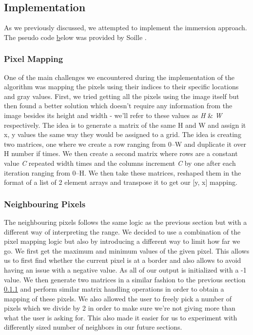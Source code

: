 \documentclass{article}
\begin{document}
\subsection{Implementation}
As we previously discussed, we attempted to implement the immersion approach. The pseudo code \href{alg:immersion_alg} below was provided by Soille \cite{soilletextbook}.
\newline
\subsubsection{Pixel Mapping}
\label{sec:pixel_mapping}
\begin{flushleft}
One of the main challenges we encountered during the implementation of the algorithm was mapping the pixels using their indices to their specific locations and gray values. First, we tried getting all the pixels using the image itself but then found a better solution which doesn't require any information from the image besides its height and width - we'll refer to these values as \textit{H} \& \textit{W} respectively. The idea is to generate a matrix of the same H and W and assign it x, y values the same way they would be assigned to a grid. The idea is creating two matrices, one where we create a row ranging from \numrange[range-phrase = --]{0}{W} and duplicate it over H number if times. We then create a second matrix where rows are a constant value \textit{C} repeated width times and the columns increment \textit{C} by one after each iteration ranging from \numrange[range-phrase = --]{0}{H}. We then take these matrices, reshaped them in the format of a list of 2 element arrays and transpose it to get our [y, x] mapping.
\end{flushleft}
\subsubsection{Neighbouring Pixels}
\begin{flushleft}
The neighbouring pixels follows the same logic as the previous section but with a different way of interpreting the range.  We decided to use a combination of the pixel mapping logic but also by introducing a different way to limit how far we go. We first get the maximum and minimum values of the given pixel. This allows us to first find whether the current pixel is at a border and also allows to avoid having an issue with a negative value. As all of our output is initialized with a -1 value. We then generate two matrices in a similar fashion to the previous section \ref{sec:pixel_mapping} and perform similar matrix handling operations in order to obtain a mapping of these pixels. We also allowed the user to freely pick a number of pixels which we divide by 2 in order to make sure we're not giving more than what the user is asking for. This also made it easier for us to experiment with differently sized number of neighbors in our future sections.
\end{flushleft}
\end{document}
